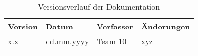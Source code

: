 \documentclass{scrarticle}                %
\begin{document}
\begin{longtable}{|p{2cm}|p{3cm}|p{3cm}|p{5cm}|}
	\hline
	\textbf{Version} & \textbf{Datum} & \textbf{Verfasser} & \textbf{Änderungen} \\
	\hline
	x.x              & dd.mm.yyyy     & Team 10            & xyz                 \\
	\hline
	\caption{Versionsverlauf der Dokumentation}
\end{longtable}

\newpage

\tableofcontents
\newpage


\newpage


\newpage


\thispagestyle{nofooter}
\newpage


\thispagestyle{nofooter}
\newpage

\setcounter{page}{1}

\end{document}
